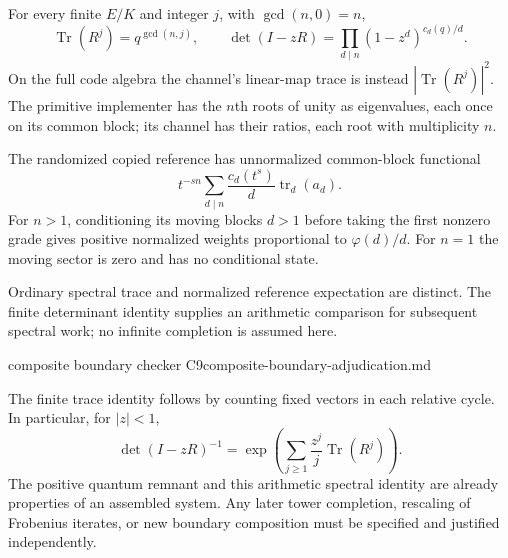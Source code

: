 \begin{proposition}
\statusProved\quad
For every finite $E/K$ and integer $j$, with $\gcd(n,0)=n$,
\[
 \operatorname{Tr}(R^j)=q^{\gcd(n,j)},\qquad
 \det(I-zR)=\prod_{d\mid n}(1-z^d)^{c_d(q)/d}.
\]
On the full code algebra the channel's linear-map trace is instead
$|\operatorname{Tr}(R^j)|^2$. The primitive implementer has the $n$th
roots of unity as eigenvalues, each once on its common block; its channel
has their ratios, each root with multiplicity $n$.

The randomized copied reference has unnormalized common-block functional
\[
 t^{-sn}\sum_{d\mid n}\frac{c_d(t^s)}d\operatorname{tr}_d(a_d).
\]
For $n>1$, conditioning its moving blocks $d>1$ before taking the first
nonzero grade gives positive normalized weights proportional to $\varphi(d)/d$.
For $n=1$ the moving sector is zero and has no conditional state.
\end{proposition}
\begin{scope}
Ordinary spectral trace and normalized reference expectation are distinct.
The finite determinant identity supplies an arithmetic comparison for
subsequent spectral work; no infinite completion is assumed here.
\end{scope}
{composite boundary checker C9}{composite-boundary-adjudication.md}

The finite trace identity follows by counting fixed vectors in each
relative cycle. In particular, for $|z|<1$,
\[
 \det(I-zR)^{-1}
 =\exp\!\left(\sum_{j\geq1}\frac{z^j}{j}\operatorname{Tr}(R^j)\right).
\]
The positive quantum remnant and this arithmetic spectral identity are
already properties of an assembled system. Any later tower completion,
rescaling of Frobenius iterates, or new boundary composition must be
specified and justified independently.
